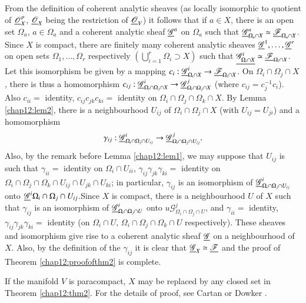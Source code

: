 \setcounter{proofoftheorem}{1}
\begin{proofoftheorem}\label{chap12:proofofthm2}
From the definition of coherent analytic sheaves (as locally
isomorphic to quotient of $\underline{\mathscr{O}}^p_X$, $\underline{\mathscr{O}}_X$
being the restriction of $\underline{\mathscr{O}}_V$) it follows that if $a
\in X$, there is an open set $\Omega_a$, $a \in \Omega_a$ and a
coherent analytic sheaf $\underline{\mathscr{G}}^a $ on $\Omega_a$ such that
$\underline{\mathscr{G}}^a_{\Omega_a \cap X} \simeq
\underline{\mathscr{F}}_{\Omega_a \cap X}$. Since $X$ is compact, there are
finitely many coherent analytic sheaves $\underline{\mathscr{G}}^1, \ldots ,
\underline{\mathscr{G}}^r$ on open sets $\Omega_1, \ldots,\Omega_r$
respectively $(\bigcup\limits^r_{i=1} \Omega_i \supset X)$ such that
$\underline{\mathscr{G}^i_{\Omega_i \cap X}} \simeq \underline{\mathscr{F}}_{\Omega_i
  \cap X}$. Let this isomorphism be given by a mapping $c_i :
\underline{\mathscr{G}}^i_{\Omega_i \cap X} \to \underline{\mathscr{F}}_{\Omega_i \cap
X}$. On $\Omega_i \cap \Omega_j \cap X$, there is thus a homomorphism
$c_{ij} : \underline{\mathscr{G}}^i_{\Omega_i \cap \Omega_j \cap X} \to
\underline{\mathscr{G}}^j_{\Omega_i \cap \Omega_j \cap X}$ (where $c_{ij} =
c^{-1}_j c_i$). Also $c_{ii} = $ identity, $c_{ij} c_{jk}  c_{ki} = $
identity on $\Omega_i \cap \Omega_j \cap \Omega_k \cap X$. By Lemma
\ref{chap12:lem2}, 
there is a neighbourhood $U_{ij}$ of $\Omega_i \cap \Omega_j \cap X$
(with $U_{ij} = U_{ji}$) and a homomorphism
$$
\gamma_{ij} : \underline{\mathscr{G}}^i_{\Omega_i \cap \Omega_j \cap U_{ij}}
\to \underline{\mathscr{G}}^j_{\Omega_i \cap \Omega_j \cap U_{ij}}.
$$
Also, by
the remark before Lemma \ref{chap12:lem1}, we may suppose that $U_{ij}$ is such that
$\gamma_{ii} = $ identity on $\Omega_i \cap U_{ii}$, $\gamma_{ij}
\gamma_{jk} \gamma_{ki} = $ identity on $\Omega_i \cap \Omega_j \cap
\Omega_k \cap U_{ij} \cap U_{jk} \cap U_{ki}$; in particular,
$\gamma_{ij}$ is an isomorphism of $\underline{\mathscr{G}}^i_{\Omega_i \cap
  \Omega_j \cap U_{ij}}$ onto $\underline{\mathscr{G}}^i \Omega_i \cap
\Omega_j \cap U_{ij}$.\pageoriginale Since $X$ is compact, there is a
neighbourhood $U$ of $X$ such that $\gamma_{ij}$ is an isomorphism of 
$\underline{\mathscr{G}}^i_{\Omega_i \cap \Omega_j \cap U}$ onto
$u{\mathscr{G}}^j_{\Omega_i \cap \Omega_j \cap U}$, and $\gamma_{ii} =
$ identity, $\gamma_{ij} \gamma_{jk} \gamma_{ki} = $ identity (on
$\Omega_i \cap U$, $\Omega_i \cap \Omega_j \cap \Omega_k \cap U$
respectively). These sheaves and isomorphism give rise to a coherent
analytic sheaf $\underline{\mathscr{G}}$ on a neighbourhood of $X$. Also, by
the definition of the $\gamma_{ij}$ it is clear that
$\underline{\mathscr{G}}_X \simeq \underline{\mathscr{F}}$ and the proof of Theorem
\ref{chap12:proofofthm2} is complete.  

If the manifold $V$ is paracompact, $X$ may be replaced by any closed
set in Theorem \ref{chap12:thm2}. For the details of proof, see Cartan
\cite{p3:key4} or Dowker \cite{p3:key6}.  
\end{proofoftheorem}

